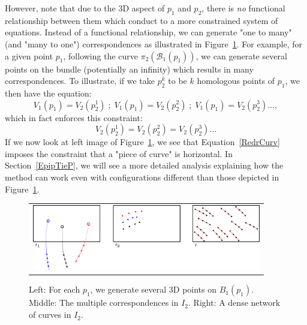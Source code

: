 \documentclass{ipol}
\newcommand{\Bund}[1]{\ensuremath{\mathcal{B}_{#1}}}
\newcommand{\BundO}{\Bund{1}}
\begin{document}
However, note that due to {the $3$D aspect} of $p_1$ and $p_2$, there is
\emph{no} functional relationship between them which conduct to a more constrained system
of equations. Instead of a functional relationship,
we can generate  "one to many" (and  "many to one") correspondences as illustrated in Figure~\ref{NonFuncCorresp}.
For example, for a given  point $p_1$, following the curve $\pi_2(\BundO(p_1))$, we can generate
several points on the bundle (potentially an infinity) which results in many correspondences.
To illustrate, if we take $p^k_2$ to be $k$ homologous points of $p_1$,
we then have the equation:
%
\begin{equation}
    V_1(p_1) = V_2(p^1_2)   \;;\; V_1(p_1) = V_2(p^2_2)   \;;\; V_1(p_1) = V_2(p^3_2)  \dots , \label{MultiTieP}
\end{equation}
%
which in fact enforces this constraint: 
%
\begin{equation}
V_2(p^1_2) = V_2(p^2_2)  =  V_2(p^3_2) \dots \label{RedrCurv}
\end{equation}
%
If we now look at left image of Figure~\ref{NonFuncCorresp}, we see that Equation~\eqref{RedrCurv}
imposes the constraint that a "piece of curve" is horizontal.
In Section~\ref{EpipTieP}, we will see a more detailed analysis explaining how the 
method can work even with configurations different than those depicted in Figure~\ref{NonFuncCorresp}.


\begin{figure}[h!]
\centering
\begin{tabular}{c}
\includegraphics[width=10cm]{FIGS/NonFuncCorresp.png}
\end{tabular}
\caption{Left: For each $p_1$, we generate several $3$D points on $B_1(p_1)$. Middle:
         The multiple correspondences in $I_2$. Right: A dense network of curves in $I_2$.}
 
\label{NonFuncCorresp}
\end{figure}

\end{document}
